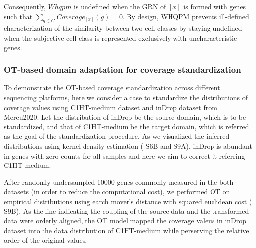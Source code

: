 \documentclass{article}
\begin{document}
Consequently, $Whqpm$ is undefined when the GRN of $[x]$ is formed with genes such that $\sum_{g\in G}Coverage_{[x]}(g)=0$. 
By design, WHQPM prevents ill-defined characterization of the similarity between two cell classes by staying 
undefined when the subjective cell class is represented exclusively with uncharacteristic genes.

\subsubsection*{
  OT-based domain adaptation for coverage standardization
}
To demonstrate the OT-based coverage standardization across different sequencing platforms, here we consider a case to 
standardize the distributions of coverage values using C1HT-medium dataset and inDrop dataset from Mereu2020. 
Let the distribution of inDrop be the source domain, which is to be standardized, and that of C1HT-medium be 
the target domain, which is referred as the goal of the standardization procedure. As we visualized the inferred 
distributions using kernel density estimation (\figurename{ S6B and S9A}), inDrop is abundant in genes with zero counts 
for all samples and here we aim to correct it referring C1HT-medium.

After randomly undersampled 10000 genes commonly measured in the both datasets (in order to reduce the computational 
cost), we performed OT on empirical distributions using earch mover's distance with squared euclidean 
cost (\figurename{ S9B}). As the line indicating the coupling of the source data and the transformed data were 
orderly aligned, the OT model mapped the coverage valeus in inDrop dataset into the data distribution of C1HT-medium 
while perserving the relative order of the original values.
\end{document}
